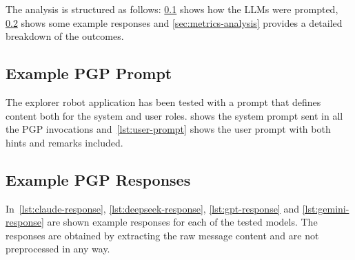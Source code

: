 \documentclass[12pt,a4paper,openright,twoside]{book}
\begin{document}
The analysis is structured as follows: \cref{sec:pgp-prompt} shows how the \acp{LLM} were prompted, \cref{sec:pgp-responses} shows some example responses and \cref{sec:metrics-analysis} provides a detailed breakdown of the outcomes.

\subsection{Example PGP Prompt}\label{sec:pgp-prompt}

The explorer robot application has been tested with a prompt that defines content both for the system and user roles.
%
 shows the system prompt sent in all the \ac{PGP} invocations and~\cref{lst:user-prompt} shows the user prompt with both hints and remarks included.





\subsection{Example PGP Responses}\label{sec:pgp-responses}

In~\cref{lst:claude-response}, \cref{lst:deepseek-response}, \cref{lst:gpt-response} and \cref{lst:gemini-response} are shown example responses for each of the tested models.
%
The responses are obtained by extracting the raw message content and are not preprocessed in any way. 





\end{document}
